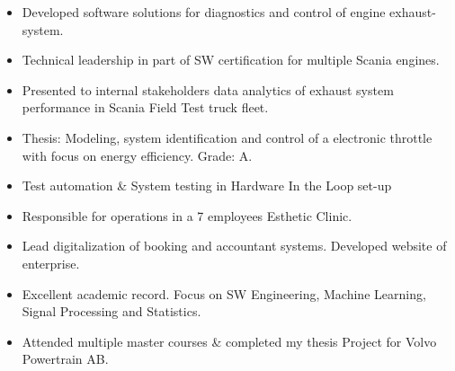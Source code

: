 \documentclass[10pt,a4paper,ragged2e,withhyper]{altacv}
\begin{document}
\smallskip

\begin{itemize}
\item Developed software solutions for diagnostics and control of engine exhaust-system.
\item Technical leadership in part of SW certification for multiple Scania engines. 
\item Presented to internal stakeholders data analytics of exhaust system performance in Scania Field Test truck fleet. 
\end{itemize}

\smallskip
{}
\begin{itemize}
\item Thesis: Modeling, system identification and control of a electronic throttle with focus on energy efficiency. Grade: A. 
\item Test automation \& System testing in Hardware In the Loop set-up
\end{itemize}

\smallskip
{}
\begin{itemize}
\item Responsible for operations in a 7 employees Esthetic Clinic.
\item Lead digitalization of booking and accountant systems. Developed website of enterprise.  
\end{itemize}


\smallskip %
{}
\begin{itemize}
\item Excellent academic record. Focus on SW Engineering, Machine Learning, Signal Processing and Statistics.
\end{itemize}

\smallskip %
{}
\begin{itemize}
\item Attended multiple master courses \& completed my thesis Project for Volvo Powertrain AB.
\end{itemize}
\end{document}
